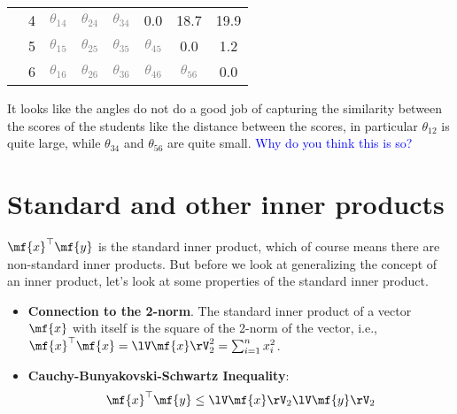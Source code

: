 \begin{boxedstuff}
\begin{example}
\begin{small}
\begin{center}
\begin{tabular}{lc|cccccc|}
                \multicolumn{1}{|l|}{} & 4 & \multicolumn{1}{c|}{\textcolor{gray}{$\theta_{14}$}} & \multicolumn{1}{c|}{\textcolor{gray}{$\theta_{24}$}} & \multicolumn{1}{c|}{\textcolor{gray}{$\theta_{34}$}} & \multicolumn{1}{c|}{0.0} & \multicolumn{1}{c|}{18.7} & 19.9 \\ \cline{2-8} 
                \multicolumn{1}{|l|}{} & 5 & \multicolumn{1}{c|}{\textcolor{gray}{$\theta_{15}$}} & \multicolumn{1}{c|}{\textcolor{gray}{$\theta_{25}$}} & \multicolumn{1}{c|}{\textcolor{gray}{$\theta_{35}$}} & \multicolumn{1}{c|}{\textcolor{gray}{$\theta_{45}$}} & \multicolumn{1}{c|}{0.0} & 1.2 \\ \cline{2-8} 
                \multicolumn{1}{|l|}{} & 6 & \multicolumn{1}{c|}{\textcolor{gray}{$\theta_{16}$}} & \multicolumn{1}{c|}{\textcolor{gray}{$\theta_{26}$}} & \multicolumn{1}{c|}{\textcolor{gray}{$\theta_{36}$}} & \multicolumn{1}{c|}{\textcolor{gray}{$\theta_{46}$}} & \multicolumn{1}{c|}{\textcolor{gray}{$\theta_{56}$}} & 0.0 \\ \hline
                \end{tabular}
            \end{center}
        \end{small}
    \end{example}
    It looks like the angles do not do a good job of capturing the similarity between the scores of the students like the distance between the scores, in particular $\theta_{12}$ is quite large, while $\theta_{34}$ and $\theta_{56}$ are quite small. \textcolor{blue}{Why do you think this is so?}
\end{boxedstuff}

\section{Standard and other inner products}
$\mf{x}^\top\mf{y}$ is the standard inner product, which of course means there are non-standard inner products. But before we look at generalizing the concept of an inner product, let's look at some properties of the standard inner product.
\begin{itemize}
    \item \textbf{Connection to the 2-norm}. The standard inner product of a vector $\mf{x}$ with itself is the square of the 2-norm of the vector, i.e., $\mf{x}^\top\mf{x} = \lV \mf{x} \rV_2^2 = \sum_{i=1}^n x_i^2$.
    \item \textbf{Cauchy-Bunyakovski-Schwartz Inequality}:
    \begin{equation}
        \mf{x}^\top\mf{y} \leq \lV \mf{x} \rV_2 \lV \mf{y} \rV_2
        \label{eq:cauchy-schwartz}
    \end{equation}
\end{itemize}

